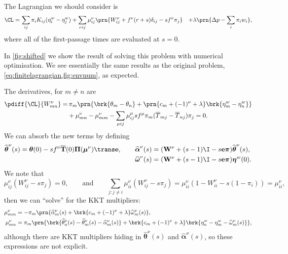 \documentclass[12pt]{article}
\newcommand{\onev}{\mathbf{e}}
\newcommand{\eqm}{\pi}
\newcommand{\eq}{\boldsymbol{\eqm}}
\newcommand{\Eqm}{\Pi}
\newcommand{\Eq}{\boldsymbol{\Eqm}}
\newcommand{\fptm}{T}
\newcommand{\fpt}{\mathbf{\fptm}}
\newcommand{\fptbm}{\overline{\fptm}}
\newcommand{\fptb}{\overline{\fpt}}
\newcommand{\etwm}{\eta^w}
\newcommand{\etw}{\boldsymbol{\eta}^w}
\newcommand{\thbm}{\theta}
\newcommand{\thb}{\boldsymbol{\thbm}}
\newcommand{\ombm}{\omega}
\newcommand{\omb}{\boldsymbol{\ombm}}
\newcommand{\albm}{\alpha}
\newcommand{\alb}{\boldsymbol{\albm}}
\newcommand{\wm}{w}
\newcommand{\Wm}{W}
\newcommand{\W}{\mathbf{\Wm}}
\newcommand{\encm}{K}
\newcommand{\kktm}{\mu}
\newcommand{\kkt}{\boldsymbol{\kktm}}
\newcommand{\shift}[1]{\widehat{#1}}
\begin{document}
The Lagrangian we should consider is
%
\begin{equation}\label{eq:lshiftlagrangian}
\begin{aligned}
  \CL =&\, \sum_{ij} \eqm_i \encm_{ij} (\etwm_i - \etwm_j)
        +\sum_{\nu i j} \kktm^\nu_{ij}\prn{\Wm^\nu_{ij} + f^\nu (r + s) \delta_{ij} -  s f^\nu \eqm_j }
        &+ \lambda \prn{ \Delta p - \sum_i \eqm_i \wm_i },
\end{aligned}
\end{equation}
%
where all of the first-passage times are evaluated at \(s = 0\).

In \cref{fig:shifted} we show the result of solving this problem with numerical optimisation.
We see essentially the same results as the original problem, \cref{eq:finitelagrangian,fig:envnum}, as expected.

The derivatives, for \(m \neq n\) are
%
\begin{equation}\label{eq:lshiftderivs}
\begin{aligned}
  \pdiff{\CL}{\Wm^\nu_{mn}} = & \,
    \eqm_m \prn{ \brk{\thbm_m - \thbm_n}
     + \prn{{c}_m + (-1)^\nu + \lambda} \brk{\etwm_m - \etwm_n} } \\
     &+ \kktm^\nu_{mn} -  \kktm^\nu_{mm}
     - \sum_{\mu ij} \kktm^\mu_{ij} s f^\mu \eqm_m (\fptbm_{mj} - \fptbm_{nj}) \eqm_j
    = 0.
\end{aligned}
\end{equation}
%
We can absorb the new terms by defining
%
\begin{equation*}
\begin{aligned}
  \shift{\thb}^\nu(s) = \thb(0) - s f^\nu \fptb(0) \Eq (\kkt^\nu)\trans \onev,
  \qquad
  \shift{\alb}^\nu(s) &= (\W^\nu + (s - 1) \I - s \onev \eq) \shift{\thb}^\nu(s),
  \\
  \shift{\omb}^\nu(s) &= (\W^\nu + (s - 1) \I - s \onev \eq) \etw(0).
\end{aligned}
\end{equation*}
%
We note that
%
\begin{equation*}
  \kktm^\nu_{ij} (\Wm^\nu_{ij} - s \eqm_j) = 0,
  \qquad \text{and} \qquad
  \sum_{j: j \neq i} \kktm^\nu_{ii} (\Wm^\nu_{ij} - s \eqm_j)
      = \kktm^\nu_{ii} (1 - \Wm^\nu_{ii} - s (1 - \eqm_i)) = \kktm^\nu_{ii},
\end{equation*}
%
then we can ``solve'' for the KKT multipliers:
%
\begin{equation}\label{eq:lshiftsol}
\begin{aligned}
  \kktm^\nu_{mm} &= - \eqm_m \prn{ \shift{\albm}^\nu_m(s) 
    + \brk{ {c}_m + (-1)^\nu + \lambda } \shift{\ombm}^\nu_m(s)
    }, \\
  \kktm^\nu_{mn} &= \eqm_m \prn{ 
      \brk{ \shift{\thbm}^\nu_n(s) - \shift{\thbm}^\nu_m(s) - \shift{\albm}^\nu_m(s) }
    + \brk{ {c}_m + (-1)^\nu + \lambda } 
        \brk{ \etwm_n - \etwm_m - \shift{\ombm}^\nu_m(s) }
     }, \\
\end{aligned}
\end{equation}
%
although there are KKT multipliers hiding in \(\shift{\thb}^\nu(s)\) and \(\shift{\alb}^\nu(s)\), so these expressions are not explicit.
\end{document}

